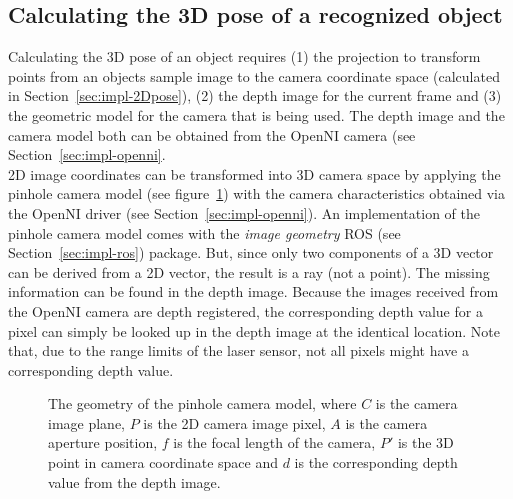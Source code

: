 \subsection{Calculating the 3D pose of a recognized object}
\label{sec:impl-3Dpose}
Calculating the 3D pose of an object requires (1) the projection to transform points from an objects sample image to the camera coordinate space (calculated in Section~\ref{sec:impl-2Dpose}), (2) the depth image for the current frame and (3) the geometric model for the camera that is being used. The depth image and the camera model both can be obtained from the OpenNI camera (see Section~\ref{sec:impl-openni}. \\

2D image coordinates can be transformed into 3D camera space by applying the pinhole camera model (see figure~\ref{fig:pinhole-camera}) with the camera characteristics obtained via the OpenNI driver (see Section~\ref{sec:impl-openni}). An implementation of the pinhole camera model comes with the \textit{image geometry} ROS (see Section~\ref{sec:impl-ros}) package. But, since only two components of a 3D vector can be derived from a 2D vector, the result is a ray (not a point). The missing information can be found in the depth image. Because the images received from the OpenNI camera are depth registered, the corresponding depth value for a pixel can simply be looked up in the depth image at the identical location. Note that, due to the range limits of the laser sensor, not all pixels might have a corresponding depth value.

\begin{figure}[H]
  \centering
  \caption[The geometry of the pinhole camera model]{The geometry of the pinhole camera model, where $C$ is the camera image plane, $P$ is the 2D camera image pixel, $A$ is the camera aperture position, $f$ is the focal length of the camera, $P'$ is the 3D point in camera coordinate space and $d$ is the corresponding depth value from the depth image.}
  \label{fig:pinhole-camera}
\end{figure}

